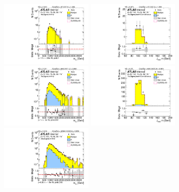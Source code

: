 \begin{figure}[htbp!]
\begin{center}
\includegraphics[width=0.41\textwidth,angle=-90]{figures/boosted/ZZ/Moriond_ZZ_FourTag_Signal_mHH_l_1.pdf}
\includegraphics[width=0.41\textwidth,angle=-90]{figures/boosted/ZZ/Moriond_ZZ_FourTag_Signal_leadHCand_Mass_s.pdf}\\
\includegraphics[width=0.41\textwidth,angle=-90]{figures/boosted/ZZ/Moriond_ZZ_ThreeTag_Signal_mHH_l_1.pdf}
\includegraphics[width=0.41\textwidth,angle=-90]{figures/boosted/ZZ/Moriond_ZZ_ThreeTag_Signal_leadHCand_Mass_s.pdf}\\
\includegraphics[width=0.41\textwidth,angle=-90]{figures/boosted/ZZ/Moriond_ZZ_TwoTag_split_Signal_mHH_l_1.pdf}

\end{center}
\end{figure}
